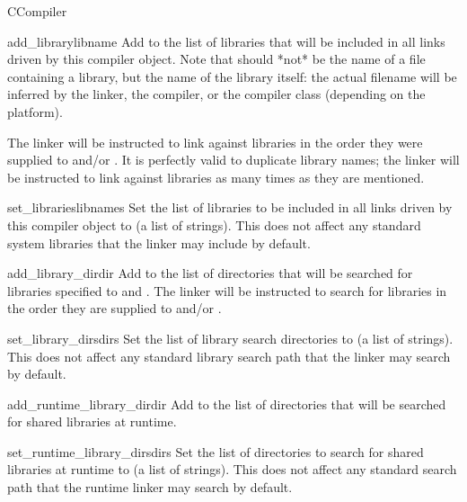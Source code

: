 \documentclass{manual}
\begin{document}
\begin{classdesc}{CCompiler}{}
\begin{methoddesc}{add_library}{libname}
Add  to the list of libraries that will be included in
all links driven by this compiler object.  Note that 
should *not* be the name of a file containing a library, but the
name of the library itself: the actual filename will be inferred by
the linker, the compiler, or the compiler class (depending on the
platform).
    
The linker will be instructed to link against libraries in the
order they were supplied to  and/or
.  It is perfectly valid to duplicate library
names; the linker will be instructed to link against libraries as
many times as they are mentioned.
\end{methoddesc}

\begin{methoddesc}{set_libraries}{libnames}
Set the list of libraries to be included in all links driven by
this compiler object to  (a list of strings).  This does
not affect any standard system libraries that the linker may
include by default.
\end{methoddesc}

\begin{methoddesc}{add_library_dir}{dir}
Add  to the list of directories that will be searched for
libraries specified to  and
.  The linker will be instructed to search for
libraries in the order they are supplied to 
and/or .
\end{methoddesc}

\begin{methoddesc}{set_library_dirs}{dirs}
Set the list of library search directories to  (a list of
strings).  This does not affect any standard library search path
that the linker may search by default.
\end{methoddesc}

\begin{methoddesc}{add_runtime_library_dir}{dir}
Add  to the list of directories that will be searched for
shared libraries at runtime.
\end{methoddesc}

\begin{methoddesc}{set_runtime_library_dirs}{dirs}
Set the list of directories to search for shared libraries at
runtime to  (a list of strings).  This does not affect any
standard search path that the runtime linker may search by
default.
\end{methoddesc}


\end{classdesc}
\end{document}
